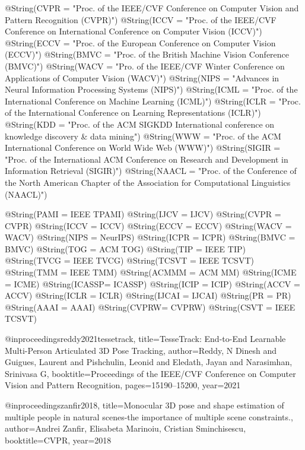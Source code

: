 @String(CVPR  = "Proc. of the IEEE/CVF Conference on Computer Vision and Pattern Recognition (CVPR)")
@String(ICCV  = "Proc. of the IEEE/CVF Conference on International Conference on Computer Vision (ICCV)")
@String(ECCV  = "Proc. of the European Conference on Computer Vision (ECCV)")
@String(BMVC  =	"Proc. of the British Machine Vision Conference (BMVC)")
@String(WACV  = "Pro. of the IEEE/CVF Winter Conference on Applications of Computer Vision (WACV)")
@String(NIPS  = "Advances in Neural Information Processing Systems (NIPS)")
@String(ICML  = "Proc. of the International Conference on Machine Learning (ICML)")
@String(ICLR  = "Proc. of the International Conference on Learning Representations (ICLR)")
@String(KDD   = "Proc. of the ACM SIGKDD International conference on knowledge discovery \& data mining")
@String(WWW   = "Proc. of the ACM International Conference on World Wide Web (WWW)")
@String(SIGIR = "Proc. of the International ACM Conference on Research and Development in Information Retrieval (SIGIR)")
@String(NAACL = "Proc. of the Conference of the North American Chapter of the Association for Computational Linguistics (NAACL)")


@String(PAMI  = {IEEE TPAMI})
@String(IJCV  = {IJCV})
@String(CVPR  = {CVPR})
@String(ICCV  = {ICCV})
@String(ECCV  = {ECCV})
@String(WACV  = {WACV})
@String(NIPS  = {NeurIPS})
@String(ICPR  = {ICPR})
@String(BMVC  =	{BMVC})
@String(TOG   = {ACM TOG})
@String(TIP   = {IEEE TIP})
@String(TVCG  = {IEEE TVCG})
@String(TCSVT = {IEEE TCSVT})
@String(TMM   =	{IEEE TMM})
@String(ACMMM = {ACM MM})
@String(ICME  =	{ICME})
@String(ICASSP=	{ICASSP})
@String(ICIP  = {ICIP})
@String(ACCV  = {ACCV})
@String(ICLR  = {ICLR})
@String(IJCAI = {IJCAI})
@String(PR = {PR})
@String(AAAI = {AAAI})
@String(CVPRW= {CVPRW})
@String(CSVT = {IEEE TCSVT})

@inproceedings{reddy2021tessetrack,
  title={Tesse{T}rack: End-to-End Learnable Multi-Person Articulated {3D} Pose Tracking},
  author={Reddy, N Dinesh and Guigues, Laurent and Pishchulin, Leonid and Eledath, Jayan and Narasimhan, Srinivasa G},
  booktitle={Proceedings of the IEEE/CVF Conference on Computer Vision and Pattern Recognition},
  pages={15190--15200},
  year={2021}
}

@inproceedings{zanfir2018,
  title={Monocular {3D} pose and shape estimation of multiple people in natural scenes-the importance of multiple scene constraints.},
  author={Andrei Zanfir, Elisabeta Marinoiu, Cristian Sminchisescu},
  booktitle=CVPR,
  year={2018}
}

